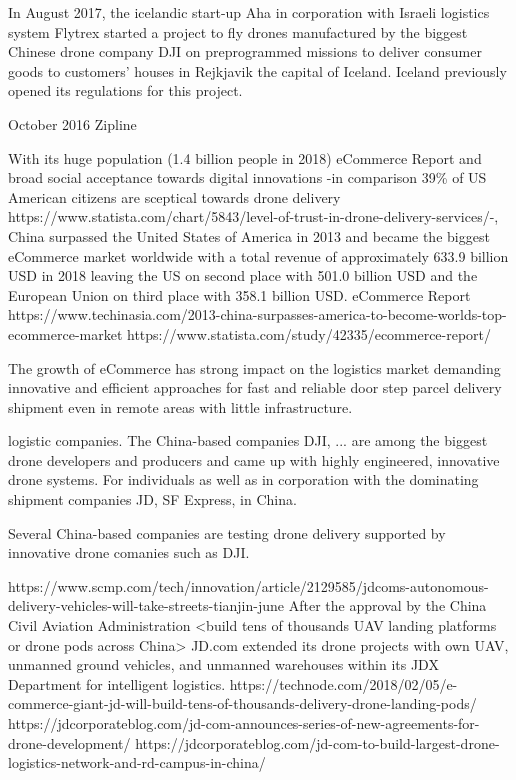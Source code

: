 In August 2017, the icelandic start-up Aha in corporation with Israeli logistics system Flytrex 
started a project to fly drones 
manufactured by the biggest Chinese drone company DJI
on preprogrammed missions to deliver consumer goods to customers' houses
in Rejkjavik the capital of Iceland. 
Iceland previously opened its regulations for this project.
\cite{Ross2018}


October 2016 Zipline


With its huge population (1.4 billion people in 2018)
eCommerce Report
and broad social acceptance towards digital innovations
-in comparison 39\% of US American citizens
are sceptical towards drone delivery
https://www.statista.com/chart/5843/level-of-trust-in-drone-delivery-services/-,
China surpassed the United States of America in 2013 and
became the biggest eCommerce market worldwide with
a total revenue of approximately 633.9 billion USD in 2018
leaving the US on second place with 501.0 billion USD and 
the European Union on third place with 358.1 billion USD.
eCommerce Report
https://www.techinasia.com/2013-china-surpasses-america-to-become-worlds-top-ecommerce-market
https://www.statista.com/study/42335/ecommerce-report/

The growth of eCommerce has
strong impact on the logistics market
demanding innovative and efficient approaches
for fast and reliable door step parcel delivery shipment
even in remote areas with little infrastructure.



 
logistic companies.
The China-based companies DJI, ... are among the biggest drone developers and producers
and came up with highly engineered, innovative drone systems.
For individuals as well as in corporation with the
dominating shipment companies JD, SF Express, in China.

Several China-based companies 
are testing drone delivery supported by
innovative drone comanies such as DJI.


https://www.scmp.com/tech/innovation/article/2129585/jdcoms-autonomous-delivery-vehicles-will-take-streets-tianjin-june
After the approval by the China Civil Aviation Administration
<build tens of thousands UAV landing platforms or drone pods across China>
JD.com extended its drone projects
with own UAV, unmanned ground vehicles, and unmanned warehouses
within its JDX Department for intelligent logistics.
https://technode.com/2018/02/05/e-commerce-giant-jd-will-build-tens-of-thousands-delivery-drone-landing-pods/
https://jdcorporateblog.com/jd-com-announces-series-of-new-agreements-for-drone-development/
https://jdcorporateblog.com/jd-com-to-build-largest-drone-logistics-network-and-rd-campus-in-china/


